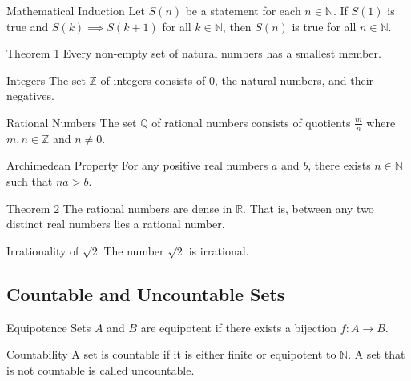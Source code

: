 \begin{theorembox}{Mathematical Induction}
Let $S(n)$ be a statement for each $n \in \mathbb{N}$. If $S(1)$ is true and $S(k) \implies S(k+1)$ for all $k \in \mathbb{N}$, then $S(n)$ is true for all $n \in \mathbb{N}$.
\end{theorembox}

\begin{theorembox}{Theorem 1}
Every non-empty set of natural numbers has a smallest member.
\end{theorembox}

\begin{definitionbox}{Integers}
The set $\mathbb{Z}$ of integers consists of $0$, the natural numbers, and their negatives.
\end{definitionbox}

\begin{definitionbox}{Rational Numbers}
The set $\mathbb{Q}$ of rational numbers consists of quotients $\frac{m}{n}$ where $m,n \in \mathbb{Z}$ and $n \neq 0$.
\end{definitionbox}

\begin{theorembox}{Archimedean Property}
For any positive real numbers $a$ and $b$, there exists $n \in \mathbb{N}$ such that $na > b$.
\end{theorembox}

\begin{theorembox}{Theorem 2}
The rational numbers are dense in $\mathbb{R}$. That is, between any two distinct real numbers lies a rational number.
\end{theorembox}

\begin{theorembox}{Irrationality of $\sqrt{2}$}
The number $\sqrt{2}$ is irrational.
\end{theorembox}

\subsection{Countable and Uncountable Sets}

\begin{definitionbox}{Equipotence}
Sets $A$ and $B$ are equipotent if there exists a bijection $f: A \to B$.
\end{definitionbox}

\begin{definitionbox}{Countability}
A set is countable if it is either finite or equipotent to $\mathbb{N}$. A set that is not countable is called uncountable.
\end{definitionbox}

